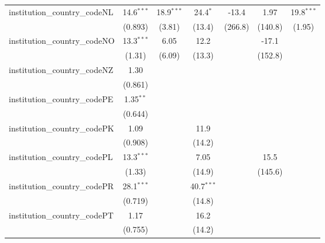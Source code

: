 \begin{tabular}{lcccccc}
   institution\_country\_codeNL          & 14.6$^{***}$  & 18.9$^{***}$ & 24.4$^{*}$   & -13.4         & 1.97          & 19.8$^{***}$\\   
                                         & (0.893)       & (3.81)       & (13.4)       & (266.8)       & (140.8)       & (1.95)\\   
   institution\_country\_codeNO          & 13.3$^{***}$  & 6.05         & 12.2         &               & -17.1         &   \\   
                                         & (1.31)        & (6.09)       & (13.3)       &               & (152.8)       &   \\   
   institution\_country\_codeNZ          & 1.30          &              &              &               &               &   \\   
                                         & (0.861)       &              &              &               &               &   \\   
   institution\_country\_codePE          & 1.35$^{**}$   &              &              &               &               &   \\   
                                         & (0.644)       &              &              &               &               &   \\   
   institution\_country\_codePK          & 1.09          &              & 11.9         &               &               &   \\   
                                         & (0.908)       &              & (14.2)       &               &               &   \\   
   institution\_country\_codePL          & 13.3$^{***}$  &              & 7.05         &               & 15.5          &   \\   
                                         & (1.33)        &              & (14.9)       &               & (145.6)       &   \\   
   institution\_country\_codePR          & 28.1$^{***}$  &              & 40.7$^{***}$ &               &               &   \\   
                                         & (0.719)       &              & (14.8)       &               &               &   \\   
   institution\_country\_codePT          & 1.17          &              & 16.2         &               &               &   \\   
                                         & (0.755)       &              & (14.2)       &               &               &   \\   

\end{tabular}
